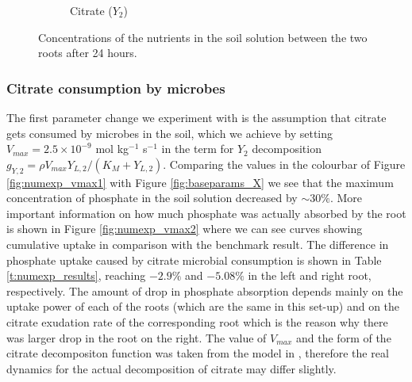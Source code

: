 \documentclass[11pt]{article}
\numberwithin{equation}{section}
\begin{document}
\begin{figure}[!htb]
\begin{subfigure}[t]{0.3\textwidth}
    \caption{Citrate ($Y_2$)}
\end{subfigure}
\caption{Concentrations of the nutrients in the soil solution between the two roots after 24 hours.}
\label{fig:baseparams}
\end{figure}

\subsubsection{Citrate consumption by microbes}
\label{sec:numexp_vmax}
The first parameter change we experiment with is the assumption that citrate gets consumed by microbes in the soil, which we achieve by setting $V_{max} = 2.5 \times 10^{-9}$ mol kg$^{-1}$ s$^{-1}$ in the term for $Y_2$ decomposition $g_{Y,2} = \rho V_{max} Y_{L,2}/(K_M+Y_{L,2})$. Comparing the values in the colourbar of Figure \ref{fig:numexp_vmax1} with Figure \ref{fig:baseparams_X} we see that the maximum concentration of phosphate in the soil solution decreased by $\sim 30\%$. More important information on how much phosphate was actually absorbed by the root is shown in Figure \ref{fig:numexp_vmax2} where we can see curves showing cumulative uptake in comparison with the benchmark result. The difference in phosphate uptake caused by citrate microbial consumption is shown in Table \ref{t:numexp_results}, reaching $-2.9\%$ and $-5.08\%$ in the left and right root, respectively. The amount of drop in phosphate absorption depends mainly on the uptake power of each of the roots (which are the same in this set-up) and on the citrate exudation rate of the corresponding root which is the reason why there was larger drop in the root on the right. The value of $V_{max}$ and the form of the citrate decompositon function was taken from the  model in \cite{Ptashnyk-2011}, therefore the real dynamics for the actual decomposition of citrate may differ slightly.
\end{document}
